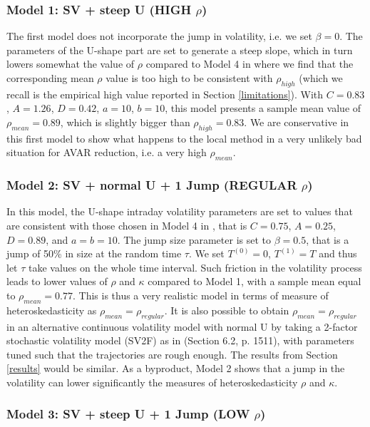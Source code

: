 \documentclass[11pt]{article}
\numberwithin{equation}{section}
\theoremstyle{plain}
\theoremstyle{remark}
\begin{document}
\subsubsection*{Model 1: SV + steep U (HIGH $\rho$)}

The first model does not incorporate the jump in volatility, i.e. we set $\beta = 0$. The parameters of the U-shape part are set to generate a steep slope, which in turn lowers somewhat the value of $\rho$  compared to Model 4 in \cite{andersen2012jump} where we find that the corresponding mean $\rho$ value is too high to be consistent with $\rho_{high}$ (which we recall is the empirical high value reported in Section \ref{limitations}). With $C=0.83$, $A=1.26$, $D=0.42$, $a=10$, $b=10$, this model presents a sample mean value of $\rho_{mean} = 0.89$, which is slightly bigger than $\rho_{high}=0.83$. We are conservative in this first model to show what happens to the local method in a very unlikely bad situation for AVAR reduction, i.e. a very high $
\rho_{mean}$.

\subsubsection*{Model 2: SV + normal U + 1 Jump (REGULAR $\rho$)}

In this model, the U-shape intraday volatility parameters are set to values that are consistent with those chosen in Model 4 in \cite{andersen2012jump}, that is $C=0.75$, $A=0.25$, $D=0.89$, and $a=b=10$. The jump size parameter is set to $\beta = 0.5$, that is a jump of 50\% in size at the random time $\tau$. We set $T^{(0)} = 0$, $T^{(1)} = T$ and thus let $\tau$ take values on the whole time interval. Such friction in the volatility process leads to lower values of $\rho$ and $\kappa$ compared to Model 1, with a sample mean equal to $\rho_{mean} = 0.77$. This is thus a very realistic model in terms of measure of heteroskedasticity as $\rho_{mean} = \rho_{regular}$. It is also possible to obtain $\rho_{mean} = \rho_{regular}$ in an alternative continuous volatility model with normal U by taking a 2-factor stochastic volatility model (SV2F) as in \cite{barndorff2008designing} (Section 6.2, p. 1511), with parameters tuned such that the trajectories are rough enough. The results from Section \ref{results} would be similar. As a byproduct, Model 2 shows that a jump in the volatility can lower significantly the measures of heteroskedasticity $\rho$ and $\kappa$. 

\subsubsection*{Model 3: SV + steep U + 1 Jump (LOW $\rho$)}
 
\end{document}
